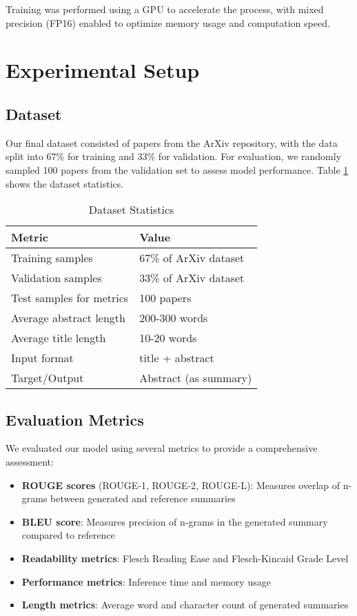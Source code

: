\documentclass[conference]{IEEEtran}
\begin{document}
Training was performed using a GPU to accelerate the process, with mixed precision (FP16) enabled to optimize memory usage and computation speed.

\section{Experimental Setup}

\subsection{Dataset}
Our final dataset consisted of papers from the ArXiv repository, with the data split into 67\% for training and 33\% for validation. For evaluation, we randomly sampled 100 papers from the validation set to assess model performance. Table \ref{table:dataset} shows the dataset statistics.

\begin{table}
\centering
\caption{Dataset Statistics}
\label{table:dataset}
\begin{tabularx}{\columnwidth}{lX}
\toprule
\textbf{Metric} & \textbf{Value} \\
\midrule
Training samples & 67\% of ArXiv dataset \\
Validation samples & 33\% of ArXiv dataset \\
Test samples for metrics & 100 papers \\
Average abstract length & 200-300 words \\
Average title length & 10-20 words \\
Input format & title + abstract \\
Target/Output & Abstract (as summary) \\
\bottomrule
\end{tabularx}
\end{table}

\subsection{Evaluation Metrics}
We evaluated our model using several metrics to provide a comprehensive assessment:

\begin{itemize}
\item \textbf{ROUGE scores} (ROUGE-1, ROUGE-2, ROUGE-L): Measures overlap of n-grams between generated and reference summaries
\item \textbf{BLEU score}: Measures precision of n-grams in the generated summary compared to reference
\item \textbf{Readability metrics}: Flesch Reading Ease and Flesch-Kincaid Grade Level
\item \textbf{Performance metrics}: Inference time and memory usage
\item \textbf{Length metrics}: Average word and character count of generated summaries
\end{itemize}
\end{document}
